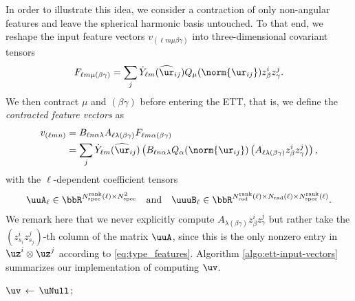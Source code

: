 In order to illustrate this idea, we consider a contraction of only non-angular features and leave the spherical harmonic basis untouched.
To that end, we reshape the input feature vectors $v_{(\ell m \mu\beta\gamma)}$ into three-dimensional covariant tensors
\begin{equation}
    F_{\ell m\mu(\beta\gamma)}
    = \sum_j \dot Y_{\ell m}(\widehat\ur_{ij}) Q_\mu(\norm{\ur_{ij}}) z^i_\beta z^j_\gamma.
\end{equation}
We then contract $\mu$ and $(\beta\gamma)$ before entering the ETT, that is, we define the \emph{contracted feature vectors} as
\begin{equation}\label{eq:reduced_ett_input_vector}
\begin{aligned}
    v_{(\ell m n)}
    &= B_{\ell n\alpha\lambda} A_{\ell\lambda(\beta\gamma)} F_{\ell m\alpha(\beta\gamma)} \\
    &= \sum_j \dot Y_{\ell m}(\widehat\ur_{ij}) \left( B_{\ell n\alpha\lambda} Q_\alpha(\norm{\ur_{ij}}) \left( A_{\ell\lambda(\beta\gamma)} z^i_\beta z^j_\gamma \right) \right),
\end{aligned}
\end{equation}
with the $\ell$-dependent coefficient tensors
\begin{align}
    \uuA_\ell \in \bbR^{N_{\rm spec}^{\rm rank}(\ell) \times N_{\rm spec}^2}
    &&\text{and}&&
    \uuuB_\ell \in \bbR^{N_{\rm rad}^{\rm rank}(\ell) \times N_{\rm rad}(\ell) \times N_{\rm spec}^{\rm rank}(\ell)}.
\end{align}
We remark here that we never explicitly compute $A_{\lambda(\beta\gamma)} z^i_\beta z^j_\gamma$ but rather take the $(z^i_{s_i} z^j_{s_j})$-th column of the matrix $\uuA$, since this is the only nonzero entry in $\uz^i \otimes \uz^j$ according to \eqref{eq:type_features}.
Algorithm \ref{algo:ett-input-vectors} summarizes our implementation of computing $\uv$.

\begin{algorithm}[hbt]
    \LinesNumbered
    \caption{Computation of the contracted feature vectors for the ETN potential \eqref{eq:tnp}}
    \label{algo:ett-input-vectors}
    $\uv \,\leftarrow\, \uNull$; \\
    \Output{$\uv$}
\end{algorithm}

